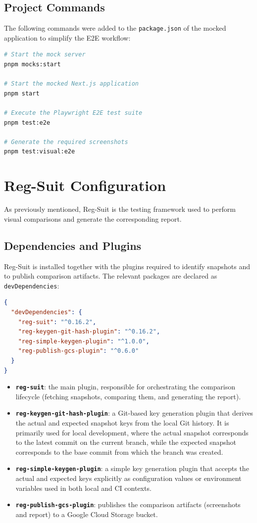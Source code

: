 \subsection{Project Commands}

The following commands were added to the \texttt{package.json} of the mocked application to simplify the \ac{E2E} workflow:

\begin{lstlisting}[language=bash]
# Start the mock server
pnpm mocks:start

# Start the mocked Next.js application
pnpm start

# Execute the Playwright E2E test suite
pnpm test:e2e

# Generate the required screenshots
pnpm test:visual:e2e
\end{lstlisting}

\section{Reg-Suit Configuration}

As previously mentioned, Reg-Suit is the testing framework used to perform visual comparisons and generate the corresponding report.

\subsection{Dependencies and Plugins}

Reg-Suit is installed together with the plugins required to identify snapshots and to publish comparison artifacts. The relevant packages are declared as \texttt{devDependencies}:

\begin{lstlisting}[language=json]
{
  "devDependencies": {
    "reg-suit": "^0.16.2",
    "reg-keygen-git-hash-plugin": "^0.16.2",
    "reg-simple-keygen-plugin": "^1.0.0",
    "reg-publish-gcs-plugin": "^0.6.0"
  }
}
\end{lstlisting}

\begin{itemize}
    \item \textbf{\texttt{reg-suit}}: the main plugin, responsible for orchestrating the comparison lifecycle (fetching snapshots, comparing them, and generating the report).
    \item \textbf{\texttt{reg-keygen-git-hash-plugin}}: a Git-based key generation plugin that derives the actual and expected snapshot keys from the local Git history. It is primarily used for local development, where the actual snapshot corresponds to the latest commit on the current branch, while the expected snapshot corresponds to the base commit from which the branch was created.
    \item \textbf{\texttt{reg-simple-keygen-plugin}}: a simple key generation plugin that accepts the actual and expected keys explicitly as configuration values or environment variables used in both local and \ac{CI} contexts.
    \item \textbf{\texttt{reg-publish-gcs-plugin}}: publishes the comparison artifacts (screenshots and report) to a Google Cloud Storage bucket.
\end{itemize}

